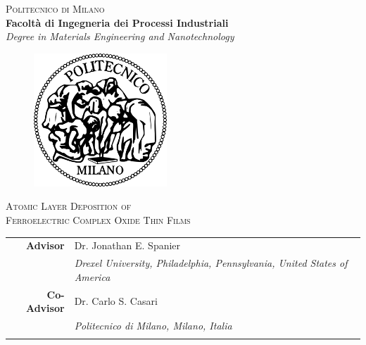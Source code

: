 \thispagestyle{empty}
\begin{titlepage}
\vspace*{-2.5cm}
\begin{center}
  {\LARGE
  \textsc{Politecnico di Milano}\\
  \textbf{\Large
  Facolt\`a di Ingegneria dei Processi Industriali}\\
  \emph{\large Degree in Materials Engineering and Nanotechnology}}\\
  \vspace*{1truecm}
  \begin{figure}[htbp]
    \begin{center}
      \includegraphics[width=5cm]{./pictures/logopm.png}
    \end{center}
  \end{figure}
  \vspace*{0.3cm}
  
   {\huge\textsc{
  Atomic Layer Deposition of \\
  Ferroelectric Complex Oxide Thin Films\\
  }}

  
  
\end{center}
\vspace*{1.0cm} \large
\begin{flushleft}

\begin{tabular*}{0.75\textwidth}{>{\bfseries}r l}
  Advisor & Dr. Jonathan E. Spanier \\
  & \emph{\small Drexel University, Philadelphia, Pennsylvania, United States of America}\\
  Co-Advisor  & Dr. Carlo S. Casari \\
  & \emph{\small Politecnico di Milano, Milano, Italia}\\
  \vspace{1.5em}
\end{tabular*}



\end{flushleft}
\end{titlepage}
